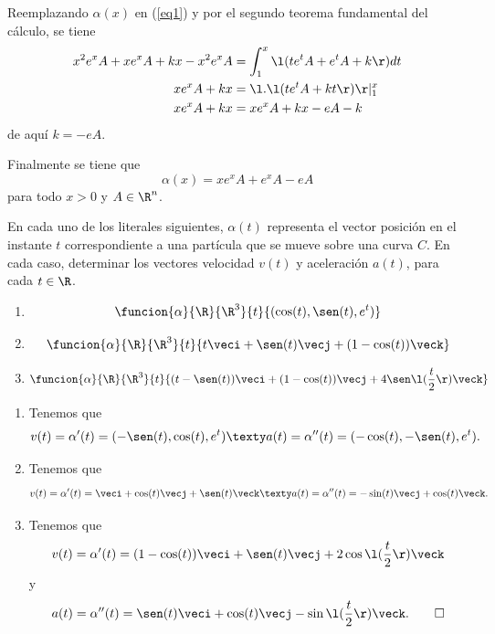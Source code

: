 \documentclass[a4,11pt]{aleph-examen}
\begin{document}
\begin{preguntas}
\begin{respuesta}
    Reemplazando $\alpha(x)$ en (\ref{eq1}) y por el segundo teorema fundamental del cálculo, se tiene
    \begin{align*}
        x^2e^xA+xe^xA+kx-x^2e^xA&=\int_1^x \l(te^tA+e^tA+k\r) dt\\
        xe^xA+kx&=\l.\l(te^tA+kt\r)\r|_1^x\\
        xe^xA+kx&=xe^xA+kx-eA-k
    \end{align*}
    de aquí $k=-eA$.
    
    Finalmente se tiene que
    \[
        \alpha(x)=xe^xA+e^xA-eA
    \]
    para todo $x>0$ y $A\in\R^n$.
\end{respuesta}

\item 
    En cada uno de los literales siguientes, $\alpha(t)$ representa el vector posición en el instante $t$ correspondiente a una partícula que se mueve sobre una curva $C$. En cada caso, determinar los vectores velocidad $v(t)$ y aceleración $a(t)$, para cada $t\in\R$.	
    \begin{enumerate}
    \item 
        \[
            \funcion{\alpha}{\R}{\R^3}{t}{(\cos(t),\sen(t),e^t)}
        \]
    \item
        \[
            \funcion{\alpha}{\R}{\R^3}{t}{t\veci+\sen(t)\vecj+(1-\cos(t))\veck}
        \]
    \item
    	\[
        	\funcion{\alpha}{\R}{\R^3}{t}{(t-\sen(t))\veci+(1-\cos(t))\vecj+4\sen\l(\frac{t}{2}\r)\veck}
       	\]
    \end{enumerate}

\begin{respuesta}
    \begin{enumerate}
    \item
        Tenemos que
        \[
            v(t)=\alpha'(t)=(-\sen(t),\cos(t),e^t)
            \texty
            a(t)=\alpha''(t)=(-\cos(t),-\sen(t),e^t).
        \]
    \item
        Tenemos que
        \[
            v(t)=\alpha'(t)=\veci +\cos(t)\vecj +\sen(t)\veck
            \texty
            a(t)=\alpha''(t)= -\sin(t)\vecj +\cos(t)\veck.
        \]
    \item
    	Tenemos que
        \[
            v(t)=\alpha'(t)=(1-\cos(t))\veci +\sen(t)\vecj +2\cos\l(\frac{t}{2}\r)\veck
        \]
        y
        \[
            a(t)=\alpha''(t)= \sen(t)\veci +\cos(t)\vecj -\sin\l(\frac{t}{2}\r)\veck. \qedhere
        \]
    \end{enumerate}
\end{respuesta}


\end{preguntas}
\end{document}

